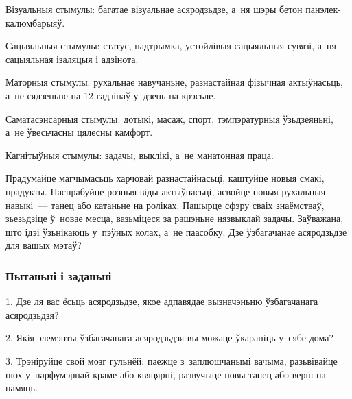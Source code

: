Візуальныя стымулы: багатае візуальнае асяродзьдзе, а~ня шэры бетон панэлек-калюмбарыяў. 

Сацыяльныя стымулы: статус, падтрымка, устойлівыя сацыяльныя сувязі, а~ня сацыяльная ізаляцыя і адзінота. 

Маторныя стымулы: рухальнае навучаньне, разнастайная фізычная актыўнасьць, а~не сядзеньне па 12 гадзінаў у~дзень на крэсьле. 

Саматасэнсарныя стымулы: дотыкі, масаж, спорт, тэмпэратурныя ўзьдзеяньні, а~не ўвесьчасны цялесны камфорт.

Кагнітыўныя стымулы: задачы, выклікі, а~не манатонная праца.

Прадумайце магчымасьць харчовай разнастайнасьці, каштуйце новыя смакі, прадукты. Паспрабуйце розныя віды актыўнасьці, асвойце новыя рухальныя навыкі~--- танец або катаньне на роліках. Пашырце сфэру сваіх знаёмстваў, зьезьдзіце ў~новае месца, вазьміцеся за рашэньне нязвыклай задачы. Заўважана, што ідэі ўзьнікаюць у~пэўных колах, а~не паасобку. Дзе ўзбагачанае асяродзьдзе для вашых мэтаў?

\subsubsection{Пытаньні і заданьні}

1. Дзе ля вас ёсьць асяродзьдзе, якое адпавядае вызначэньню ўзбагачанага асяродзьдзя?

2. Якія элемэнты ўзбагачанага асяродзьдзя вы можаце ўкараніць у~сябе дома?

3. Трэніруйце свой мозг гульнёй: паежце з~заплюшчанымі вачыма, разьвівайце нюх у~парфумэрнай краме або квяцярні, развучыце новы танец або верш на памяць.

